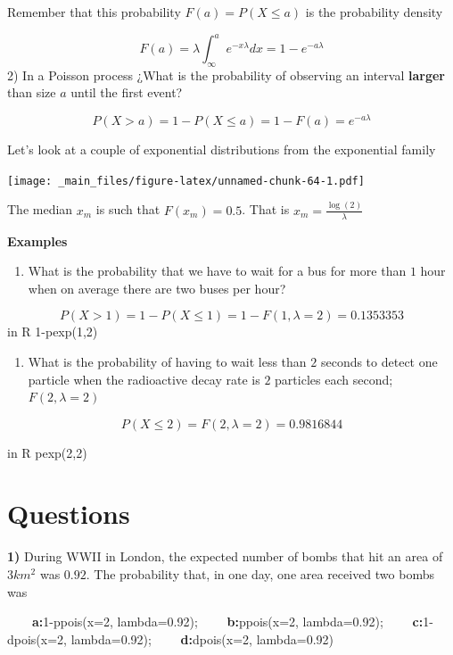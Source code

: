 \documentclass[
]{book}
\providecommand{\tightlist}{%
  \setlength{\itemsep}{0pt}\setlength{\parskip}{0pt}}
\begin{document}
Remember that this probability \(F(a)=P(X \leq a)\) is the probability density

\[F(a)=\lambda \int_\infty^a e^{-x\lambda}dx=1-e^{-a\lambda}\]
2) In a Poisson process ¿What is the probability of observing an interval \textbf{larger} than size \(a\) until the first event?

\[P(X > a)=1- P(X \leq a)= 1- F(a) = e^{-a\lambda}\]

Let's look at a couple of exponential distributions from the exponential family

\texttt{[image: \_main\_files/figure-latex/unnamed-chunk-64-1.pdf]}

The median \(x_m\) is such that \(F(x_m)=0.5\). That is \(x_m=\frac{\log(2)}{\lambda}\)

\textbf{Examples}

\begin{enumerate}
\def\labelenumi{\arabic{enumi})}
\tightlist
\item
  What is the probability that we have to wait for a bus for more than \(1\) hour when on average there are two buses per hour?
\end{enumerate}

\[P(X > 1)=1-P(X \le 1) = 1-F(1,\lambda=2)=0.1353353\]
in R 1-pexp(1,2)

\begin{enumerate}
\def\labelenumi{\arabic{enumi})}
\setcounter{enumi}{1}
\tightlist
\item
  What is the probability of having to wait less than \(2\) seconds to detect one particle when the radioactive decay rate is \(2\) particles each second; \(F(2,\lambda=2)\)
\end{enumerate}

\[P(X \le 2)=F(2,\lambda=2)=0.9816844\]

in R pexp(2,2)

\hypertarget{questions-5}{%
\section{Questions}\label{questions-5}}

\textbf{1)} During WWII in London, the expected number of bombs that hit an area of \(3km^2\) was \(0.92\). The probability that, in one day, one area received two bombs was

\textbf{\(\qquad\)a:}1-ppois(x=2, lambda=0.92);
\textbf{\(\qquad\)b:}ppois(x=2, lambda=0.92); \textbf{\(\qquad\)c:}1-dpois(x=2, lambda=0.92); \textbf{\(\qquad\)d:}dpois(x=2, lambda=0.92)
\end{document}
